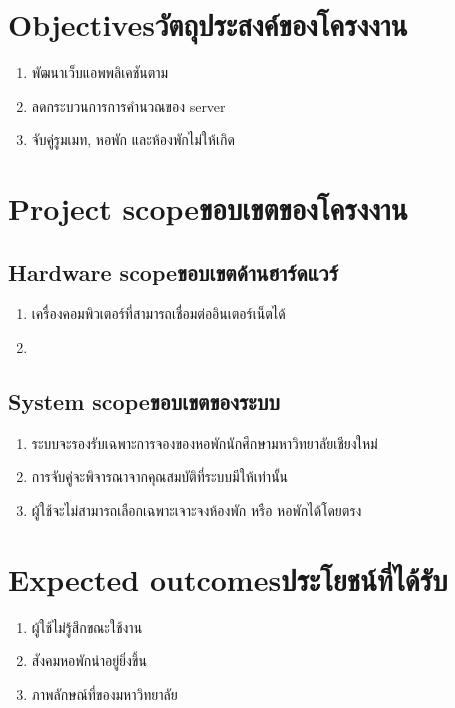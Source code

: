 \section{\ifenglish Objectives\else วัตถุประสงค์ของโครงงาน\fi}
\begin{enumerate}
    \item พัฒนาเว็บแอพพลิเคชันตาม
    \item ลดกระบวนการการคำนวณของ server
    \item จับคู่รูมเมท, หอพัก และห้องพักไม่ให้เกิด 
\end{enumerate}

\section{\ifenglish Project scope\else ขอบเขตของโครงงาน\fi}
\subsection{\ifenglish Hardware scope\else ขอบเขตด้านฮาร์ดแวร์\fi}
\begin{enumerate}
    \item เครื่องคอมพิวเตอร์ที่สามารถเชื่อมต่ออินเตอร์เน็ตได้
    \item {}
\end{enumerate}
\subsection{\ifenglish System scope\else ขอบเขตของระบบ\fi}
\begin{enumerate}
    \item ระบบจะรองรับเฉพาะการจองของหอพักนักศึกษามหาวิทยาลัยเชียงใหม่
    \item การจับคู่จะพิจารณาจากคุณสมบัติที่ระบบมีให้เท่านั้น
    \item ผู้ใช้จะไม่สามารถเลือกเฉพาะเจาะจงห้องพัก หรือ หอพักได้โดยตรง
\end{enumerate}

\section{\ifenglish Expected outcomes\else ประโยชน์ที่ได้รับ\fi}
\begin{enumerate}
    \item ผู้ใช้ไม่รู้สึกขณะใช้งาน
    \item สังคมหอพักน่าอยู่ยิ่งขึ้น
    \item ภาพลักษณ์ที่ของมหาวิทยาลัย
\end{enumerate}

